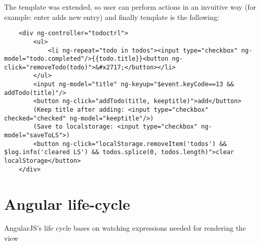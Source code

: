 \documentclass[inzynier,druk,ramka]{build/dyplom}
\begin{document}
The template was extended, so user can perform actions in an invuitive way (for example: enter adds new entry) and finally template is the following:

\begin{lstlisting}
    <div ng-controller="todoctrl">
        <ul>
            <li ng-repeat="todo in todos"><input type="checkbox" ng-model="todo.completed"/>{{todo.title}}<button ng-click="removeTodo(todo)">&#x2717;</button></li>
        </ul>
        <input ng-model="title" ng-keyup="$event.keyCode==13 && addTodo(title)"/>
        <button ng-click="addTodo(title, keeptitle)">add</button>
        (Keep title after adding: <input type="checkbox" checked="checked" ng-model="keeptitle"/>)
        (Save to localstorage: <input type="checkbox" ng-model="saveToLS">)
        <button ng-click="localStorage.removeItem('todos') && $log.info('cleared LS') && todos.splice(0, todos.length)">clear localStorage</button>
    </div>
\end{lstlisting}

\section{Angular life-cycle}

%

AngularJS's life cycle bases on watching expressions needed for rendering the view \cite{angularlifecycle}
\end{document}
